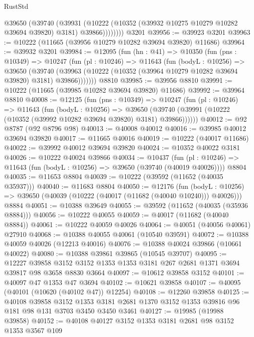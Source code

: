 \begin{lexlean}{RustStd}
\begin{coremodule}
            @39650
              (@39740
                (@39931
                  (@10222 (@10352 (@39932 @10275 @10279 @10282 @39694 @39820) @3181) @39866))))))))
    @3201
@39956 := @39923 @3201
@39963 := @10222 (@11665 (@39956 @10279 @10282 @39694 @39820) @11686)
@39964 := @39932 @3201
@39984 := @12095
    (fun (hn : @41) =>
    @10350
      (fun (pns : @10349) =>
      @10247
        (fun (pl : @10246) =>
        @11643
          (fun (bodyL : @10256) =>
          @39650
            (@39740
              (@39963 (@10222 (@10352 (@39964 @10279 @10282 @39694 @39820) @3181) @39866)))))))
    @8810
@39985 := @39956 @8810
@39991 := @10222 (@11665 (@39985 @10282 @39694 @39820) @11686)
@39992 := @39964 @8810
@40008 := @12125
    (fun (pns : @10349) =>
    @10247
      (fun (pl : @10246) =>
      @11643
        (fun (bodyL : @10256) =>
        @39650 (@39740 (@39991 (@10222 (@10352 (@39992 @10282 @39694 @39820) @3181) @39866))))))
@40012 := @92 @8787 (@92 @8796 @98)
@40013 := @40008 @40012
@40016 := @39985 @40012 @39694 @39820
@40017 := @11665 @40016
@40019 := @10222 (@40017 @11686)
@40022 := @39992 @40012 @39694 @39820
@40024 := @10352 @40022 @3181
@40026 := @10222 @40024 @39866
@40034 := @10437
    (fun (pl : @10246) => @11643 (fun (bodyL : @10256) => @39650 (@39740 (@40019 @40026))))
    @8804
@40035 := @11653 @8804
@40039 := @10222 (@39592 (@11652 (@40035 @35937)))
@40040 := @11683 @8804
@40050 := @12176
    (fun (bodyL : @10256) => @39650 (@40039 (@10222 (@40017 (@11682 (@40040 @10240))) @40026)))
    @8884
@40051 := @10388 @39649
@40055 := @39592 (@11652 (@40035 (@35936 @8884)))
@40056 := @10222 @40055
@40059 := @40017 (@11682 (@40040 @8884))
@40061 := @10222 @40059 @40026
@40064 := @40051 (@40056 @40061) @27910
@40068 := @10388 @40055 @40061 (@10540 @39591)
@40072 := @10388 @40059 @40026 (@12213 @40016)
@40076 := @10388 @40024 @39866 (@10661 @40022)
@40080 := @10388 @39861 @39865 (@10545 @39707)
@40095 := @12227
    @39858
    @3152
    @3152
    @1353
    @1353
    @3181
    @267
    @2681
    @1371
    @3694
    @39817
    @98
    @3658
    @8830
    @3664
@40097 := @10612 @39858 @3152
@40101 := @40097 @47 @1353 @47 @3694
@40102 := @10621 @39858
@40107 := @40095 (@40101 (@10620 (@40102 @47)) @12254)
@40108 := @12260 @39858
@40125 := @40108
    @39858
    @3152
    @1353
    @3181
    @2681
    @1370
    @3152
    @1353
    @39816
    @96
    @181
    @98
    @131
    @3703
    @3450
    @3450
    @3461
@40127 := @19985 (@19988 @39858)
@40152 := @40108
    @40127
    @3152
    @1353
    @3181
    @2681
    @98
    @3152
    @1353
    @3567
    @109

\end{coremodule}
\end{lexlean}
